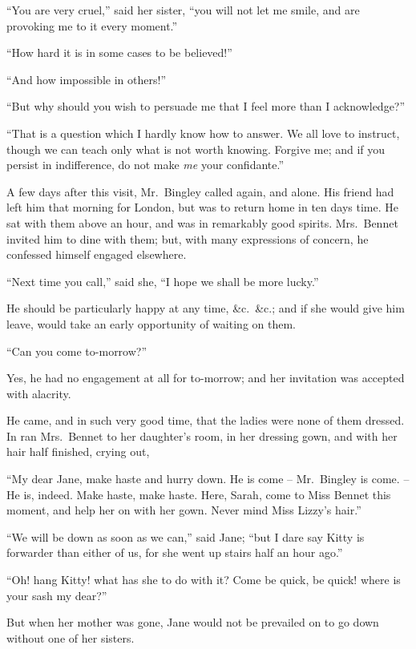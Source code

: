 “You are very cruel,” said her sister, “you will not
let me smile, and are provoking me to it every moment.”

“How hard it is in some cases to be believed!”

“And how impossible in others!”

“But why should you wish to persuade me that I feel
more than I acknowledge?”

“That is a question which I hardly know how to answer.
We all love to instruct, though we can teach only what
is not worth knowing. Forgive me; and if you persist
in indifference, do not make \textit{me} your confidante.”


A few days after this visit, Mr.\ Bingley called again,
and alone. His friend had left him that morning for
London, but was to return home in ten days time. He
sat with them above an hour, and was in remarkably good
spirits. Mrs.\ Bennet invited him to dine with them; but,
with many expressions of concern, he confessed himself
engaged elsewhere.

“Next time you call,” said she, “I hope we shall be
more lucky.”

He should be particularly happy at any time, \&c.\ \&c.;
and if she would give him leave, would take an early
opportunity of waiting on them.

“Can you come to-morrow?”

Yes, he had no engagement at all for to-morrow; and
her invitation was accepted with alacrity.

He came, and in such very good time, that the ladies
were none of them dressed. In ran Mrs.\ Bennet to her
daughter’s room, in her dressing gown, and with her hair
half finished, crying out,

“My dear Jane, make haste and hurry down. He is
come -- Mr.\ Bingley is come. -- He is, indeed. Make haste,
make haste. Here, Sarah, come to Miss Bennet this
moment, and help her on with her gown. Never mind
Miss Lizzy’s hair.”

“We will be down as soon as we can,” said Jane;
“but I dare say Kitty is forwarder than either of us, for
she went up stairs half an hour ago.”

“Oh! hang Kitty! what has she to do with it? Come
be quick, be quick! where is your sash my dear?”

But when her mother was gone, Jane would not be
prevailed on to go down without one of her sisters.

